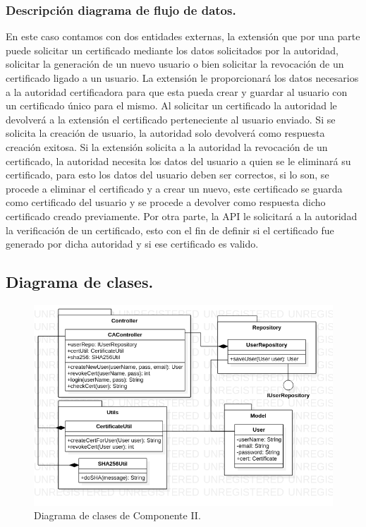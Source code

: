 \documentclass[12pt, a4paper, titlepage]{report}
\begin{document}
    		\subsubsection{Descripción diagrama de flujo de datos.}
    		En este caso contamos con dos entidades externas, la extensión que por una parte puede solicitar un certificado mediante los datos solicitados por la autoridad, solicitar la generación de un nuevo usuario o bien solicitar la revocación de un certificado ligado a un usuario. La extensión le proporcionará los datos necesarios a la autoridad certificadora para que esta pueda crear y guardar al usuario con un certificado único para el mismo. Al solicitar un certificado la autoridad le devolverá a la extensión el certificado perteneciente al usuario enviado. Si se solicita la creación de usuario, la autoridad solo devolverá como respuesta creación exitosa. Si la extensión solicita a la autoridad la revocación de un certificado, la autoridad necesita los datos del usuario a quien se le eliminará su certificado, para esto los datos del usuario deben ser correctos, si lo son, se procede a eliminar el certificado y a crear un nuevo, este certificado se guarda como certificado del usuario y se procede a devolver como respuesta dicho certificado creado previamente.
            Por otra parte, la API le solicitará a la autoridad la verificación de un certificado, esto con el fin de definir si el certificado fue generado por dicha autoridad y si ese certificado es valido.
		
		    \subsection{Diagrama de clases.}
		
    		\begin{figure}[H]
            	\begin{center}	\includegraphics[width=14cm]{./imagenes/Disenio/Componente_2/CII_CD.png}
            	\caption{Diagrama de clases de Componente II.}
            	\end{center}
    		\end{figure}
			    
\end{document}
